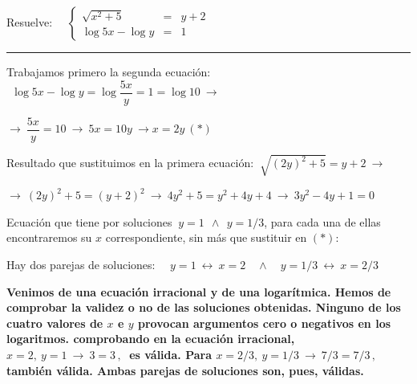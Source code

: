 \begin{miejercicio}

Resuelve: $\quad \left\{ \begin{array}{ccc} \sqrt{x^2+5}&=&y+2 \\ \log 5x- \log y&=&1\end{array} \right.$

\rule{250pt}{0.1pt}

\vspace{2mm} Trabajamos primero la segunda ecuación: $\ \ \log 5x- \log y=\log \dfrac{5x}{y}=1=\log 10 \ \to \ $

\vspace{2mm} $\to \ \dfrac{5x}{y}=10 \ \to \ 5x=10y \ \to x=2y\ (*)$

\vspace{2mm}  Resultado que sustituimos en la primera ecuación: $\ \sqrt{(2y)^2+5}=y+2 \ \to $

\vspace{2mm} $\to  \ (2y)^2+5=(y+2)^2 \ \to \ 4y^2+5=y^2+4y+4 \ \to \ 3y^2-4y+1=0$

\vspace{2mm} Ecuación que tiene por soluciones $\ y=1 \ \ \wedge \ \ y=1/3$, para cada una de ellas encontraremos su $x$ correspondiente, sin más que sustituir en $(*)$:

\vspace{2mm} Hay dos parejas de soluciones: $\quad y=1 \ \leftrightarrow \ x=2 \quad  \wedge \quad  y=1/3 \ \leftrightarrow \ x=2/3$

\vspace{2mm} \textbf{Venimos de una ecuación irracional y de una logarítmica. Hemos de comprobar la validez o no de las soluciones obtenidas. Ninguno de los cuatro valores de $x$ e $y$ provocan argumentos cero o negativos en los logaritmos. comprobando en la ecuación irracional, $x=2, \ y=1 \ \to \ 3=3\, , \ $ es válida. Para $ x=2/3,\ y=1/3 \ \to \ 7/3=7/3\, , \ $ también válida. Ambas parejas de soluciones son, pues, válidas. }
	
\end{miejercicio}


